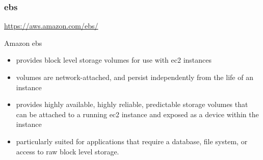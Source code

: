 \documentclass{beamer}
\begin{document}
\begin{frame}
\frametitle[\gls{ebs}]{\acrfull{ebs}}
\url{https://aws.amazon.com/ebs/}

  Amazon \gls{ebs}
  \begin{itemize}
  \item provides block level storage volumes for use with \gls{ec2} instances
  \item volumes are network-attached, and persist independently from the life of an instance
  \item provides highly available, highly reliable, predictable storage volumes that can be attached to a running \gls{ec2} instance and exposed as a device within the instance
  \item particularly suited for applications that require a database, file system, or access to raw block level storage.
  \end{itemize}
\end{frame}
\end{document}
